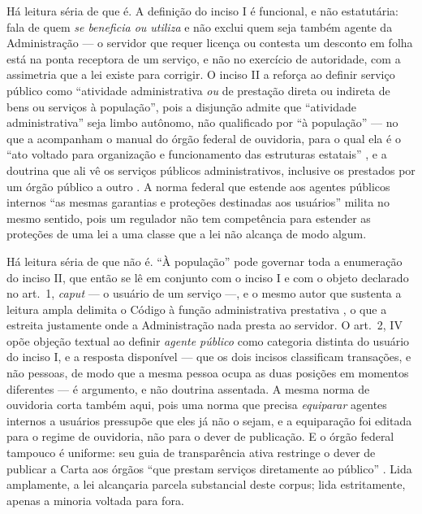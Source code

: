 Há leitura séria de que é. A definição do inciso I é funcional, e não estatutária: fala de quem
\emph{se beneficia ou utiliza} e não exclui quem seja também agente da Administração --- o servidor
que requer licença ou contesta um desconto em folha está na ponta receptora de um serviço, e não no
exercício de autoridade, com a assimetria que a lei existe para corrigir. O inciso II a reforça ao
definir serviço público como ``atividade administrativa \emph{ou} de prestação direta ou indireta de
bens ou serviços à população'', pois a disjunção admite
que ``atividade administrativa'' seja limbo autônomo, não qualificado por ``à população'' --- no que
a acompanham o manual do órgão federal de ouvidoria, para o qual ela é o ``ato voltado para
organização e funcionamento das estruturas estatais'' \cite[p.~68]{brcgu2018ouvidoria}, e a doutrina
que ali vê os serviços públicos administrativos, inclusive os prestados por um órgão público a outro
\cite{brmarrara2018cdusp}. A norma federal que estende aos agentes públicos internos ``as mesmas
garantias e proteções destinadas aos usuários'' \cite[art.~48]{brcgu2024portaria116} milita no mesmo
sentido, pois um regulador não tem competência para estender as proteções de uma lei a uma classe
que a lei não alcança de modo algum.

Há leitura séria de que não é. ``À população'' pode governar toda a enumeração do inciso II, que
então se lê em conjunto com o inciso I e com o objeto declarado no art.~1\textordmasculine{},
\emph{caput} --- o usuário de um serviço ---, e o mesmo autor que sustenta a leitura ampla delimita
o Código à função administrativa prestativa \cite{brmarrara2018cdusp}, o que a estreita justamente
onde a Administração nada presta ao servidor. O art.~2\textordmasculine{}, IV opõe objeção textual
ao definir \emph{agente público} como categoria distinta do usuário do inciso I, e a resposta
disponível --- que os dois incisos classificam transações, e não pessoas, de modo que a mesma pessoa
ocupa as duas posições em momentos diferentes --- é argumento, e não doutrina assentada. A mesma
norma de ouvidoria corta também aqui, pois uma norma que precisa \emph{equiparar} agentes internos a
usuários pressupõe que eles já não o sejam, e a equiparação foi editada para o regime de ouvidoria,
não para o dever de publicação. E o órgão federal tampouco é uniforme: seu guia de transparência
ativa restringe o dever de publicar a Carta aos órgãos ``que prestam serviços diretamente ao
público'' \cite{brcgu2019gta}. Lida amplamente, a lei alcançaria parcela substancial deste corpus;
lida estritamente, apenas a minoria voltada para fora.

